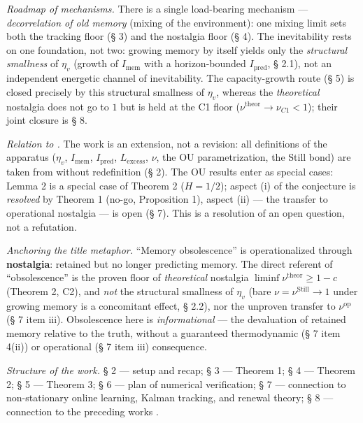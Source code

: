 \documentclass[12pt]{iopart}
\begin{document}
\emph{Roadmap of mechanisms.} There is a single load-bearing mechanism --- \emph{decorrelation of old memory} (mixing of the environment): one mixing limit sets both the tracking floor (§ 3) and the nostalgia floor (§ 4). The inevitability rests on one foundation, not two: growing memory by itself yields only the \emph{structural smallness} of \(\eta_v\) (growth of \(I_{\text{mem}}\) with a horizon-bounded \(I_{\text{pred}}\), § 2.1), not an independent energetic channel of inevitability. The capacity-growth route (§ 5) is closed precisely by this structural smallness of \(\eta_v\), whereas the \emph{theoretical} nostalgia does not go to \(1\) but is held at the C1 floor (\(\nu^{\text{theor}} \to \nu_{C1} < 1\)); their joint closure is § 8.



\emph{Relation to \cite{Andriishin2026b}.} The work is an extension, not a revision: all definitions of the apparatus (\(\eta_v\), \(I_{\text{mem}}\), \(I_{\text{pred}}\), \(L_{\text{excess}}\), \(\nu\), the OU parametrization, the Still bond) are taken from \cite{Andriishin2026b} without redefinition (§ 2). The OU results enter as special cases: Lemma 2 is a special case of Theorem 2 (\(H = 1/2\)); aspect (i) of the conjecture is \emph{resolved} by Theorem 1 (no-go, Proposition 1), aspect (ii) --- the transfer to operational nostalgia --- is open (§ 7). This is a resolution of an open question, not a refutation.



\emph{Anchoring the title metaphor.} ``Memory obsolescence'' is operationalized through \textbf{nostalgia}: retained but no longer predicting memory. The direct referent of ``obsolescence'' is the proven floor of \emph{theoretical} nostalgia \(\liminf\nu^{\text{theor}} \ge 1-c\) (Theorem 2, C2), and \emph{not} the structural smallness of \(\eta_v\) (bare \(\nu = \nu^{\text{Still}} \to 1\) under growing memory is a concomitant effect, § 2.2), nor the unproven transfer to \(\nu^{\text{op}}\) (§ 7 item iii). Obsolescence here is \emph{informational} --- the devaluation of retained memory relative to the truth, without a guaranteed thermodynamic (§ 7 item 4(ii)) or operational (§ 7 item iii) consequence.



\emph{Structure of the work.} § 2 --- setup and recap; § 3 --- Theorem 1; § 4 --- Theorem 2; § 5 --- Theorem 3; § 6 --- plan of numerical verification; § 7 --- connection to non-stationary online learning, Kalman tracking, and renewal theory; § 8 --- connection to the preceding works \cite{Andriishin2026a,Andriishin2026b}.
\end{document}

